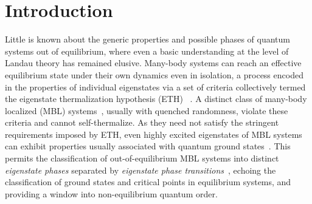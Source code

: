\documentclass[prb,aps, twocolumn, superscriptaddress]{revtex4-1}
\begin{document}
\section{Introduction} Little is known about the generic properties and possible phases of quantum systems out of equilibrium, where even a basic understanding at the level of Landau theory has remained elusive. Many-body systems can reach an effective equilibrium state under their own dynamics even in isolation, a process encoded in the properties of individual eigenstates via a set of criteria collectively termed the {eigenstate thermalization hypothesis} (ETH) ~\cite{PhysRevA.43.2046, PhysRevE.50.888}. A distinct class of {many-body localized} (MBL) systems~\cite{BAA,ARCMP}, usually with quenched randomness,  violate these criteria and  cannot self-thermalize. As they need not satisfy the stringent requirements imposed by ETH, even highly excited eigenstates of MBL systems can exhibit properties usually associated with quantum ground states~\cite{HuseMBLQuantumOrder,BauerNayak}. This permits the classification of out-of-equilibrium  MBL systems into distinct {\it eigenstate phases} separated by {\it eigenstate phase transitions}~\cite{EPTReview}, echoing the classification of ground states and critical points in equilibrium systems, and providing a window into non-equilibrium quantum order.
\end{document}
